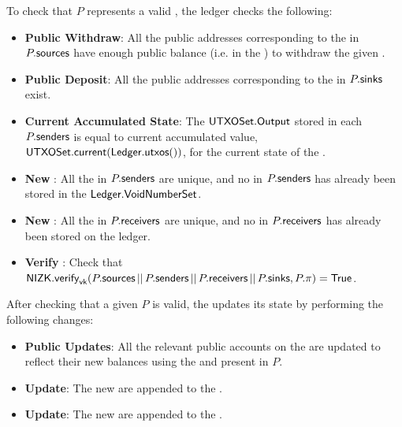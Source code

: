\begin{definition}
    To check that $P$ represents a valid \Transfer{}, the ledger checks the following:
    \begin{itemize}
        \item \textbf{Public Withdraw}: All the public addresses corresponding to the  in $P.{\textsf{sources}}$ have enough public balance (i.e. in the \PublicLedger{}) to withdraw the given \Asset{}.
        \item \textbf{Public Deposit}: All the public addresses corresponding to the  in $P.{\textsf{sinks}}$ exist.
        \item \textbf{Current Accumulated State}: The ${\textsf{UTXOSet}}.{\textsf{Output}}$ stored in each $P.{\textsf{senders}}$ is equal to current accumulated value, ${\textsf{UTXOSet}}.{\textsf{current}}({\textsf{Ledger}}.{\textsf{utxos}}())$, for the current state of the \Ledger{}.
        \item \textbf{New }: All the  in $P.{\textsf{senders}}$ are unique, and no \VoidNumber{} in $P.{\textsf{senders}}$ has already been stored in the ${\textsf{Ledger}}.{\textsf{VoidNumberSet}}$.
        \item \textbf{New }: All the  in $P.{\textsf{receivers}}$ are unique, and no \UTXO{} in $P.{\textsf{receivers}}$ has already been stored on the ledger.
        \item \textbf{Verify \Transfer{}}: Check that ${\textsf{NIZK}}.{\textsf{verify}}_{\textsf{vk}}(P.{\textsf{sources}} \,||\, P.{\textsf{senders}} \,||\, P.{\textsf{receivers}} \,||\, P.{\textsf{sinks}}, P.\pi) = {\textsf{True}}$.
    \end{itemize}
\end{definition}

\begin{definition}
    After checking that a given \TransferPost{} $P$ is valid, the \Ledger{} updates its state by performing the following changes:
    \begin{itemize}
        \item \textbf{Public Updates}: All the relevant public accounts on the \PublicLedger{} are updated to reflect their new balances using the  and  present in $P$.
        \item \textbf{\UTXOSet{} Update}: The new  are appended to the \UTXOSet{}.
        \item \textbf{\VoidNumberSet{} Update}: The new  are appended to the \VoidNumberSet{}.
    \end{itemize}
\end{definition}

